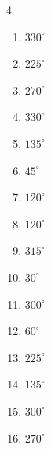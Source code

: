 \begin{multicols}{4}
\begin{enumerate}
  \item $\displaystyle 330^{\circ}$

  \item $\displaystyle 225^{\circ}$

  \item $\displaystyle 270^{\circ}$

  \item $\displaystyle 330^{\circ}$

  \item $\displaystyle 135^{\circ}$

  \item $\displaystyle 45^{\circ}$

  \item $\displaystyle 120^{\circ}$

  \item $\displaystyle 120^{\circ}$

\columnbreak %

  \item $\displaystyle 315^{\circ}$

  \item $\displaystyle 30^{\circ}$

  \item $\displaystyle 300^{\circ}$

  \item $\displaystyle 60^{\circ}$

  \item $\displaystyle 225^{\circ}$

  \item $\displaystyle 135^{\circ}$

  \item $\displaystyle 300^{\circ}$

  \item $\displaystyle 270^{\circ}$


\end{enumerate}
\end{multicols}
